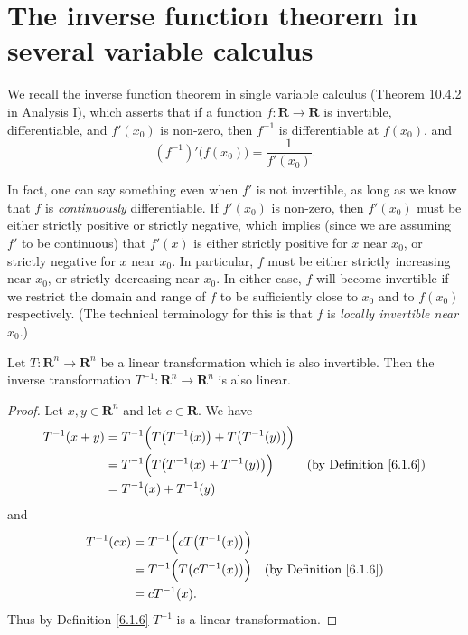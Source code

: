 \section{The inverse function theorem in several variable calculus}\label{sec 6.7}

\begin{note}
    We recall the inverse function theorem in single variable calculus (Theorem 10.4.2 in Analysis I), which asserts that if a function \(f : \mathbf{R} \to \mathbf{R}\) is invertible, differentiable, and \(f'(x_0)\) is non-zero, then \(f^{-1}\) is differentiable at \(f(x_0)\), and
    \[
        (f^{-1})'\big(f(x_0)\big) = \frac{1}{f'(x_0)}.
    \]

    In fact, one can say something even when \(f'\) is not invertible, as long as we know that \(f\) is \emph{continuously} differentiable.
    If \(f'(x_0)\) is non-zero, then \(f'(x_0)\) must be either strictly positive or strictly negative, which implies (since we are assuming \(f'\) to be continuous) that \(f'(x)\) is either strictly positive for \(x\) near \(x_0\), or strictly negative for \(x\) near \(x_0\).
    In particular, \(f\) must be either strictly increasing near \(x_0\), or strictly decreasing near \(x_0\).
    In either case, \(f\) will become invertible if we restrict the domain and range of \(f\) to be sufficiently close to \(x_0\) and to \(f(x_0)\) respectively.
    (The technical terminology for this is that \(f\) is \emph{locally invertible near \(x_0\)}.)
\end{note}

\begin{lemma}\label{6.7.1}
    Let \(T : \mathbf{R}^n \to \mathbf{R}^n\) be a linear transformation which is also invertible.
    Then the inverse transformation \(T^{-1} : \mathbf{R}^n \to \mathbf{R}^n\) is also linear.
\end{lemma}

\begin{proof}
    Let \(x, y \in \mathbf{R}^n\) and let \(c \in \mathbf{R}\).
    We have
    \begin{align*}
        T^{-1}(x + y) & = T^{-1}\Big(T\big(T^{-1}(x)\big) + T\big(T^{-1}(y)\big)\Big)                                      \\
                      & = T^{-1}\Big(T\big(T^{-1}(x) + T^{-1}(y)\big)\Big)            & \text{(by Definition \ref{6.1.6})} \\
                      & = T^{-1}(x) + T^{-1}(y)
    \end{align*}
    and
    \begin{align*}
        T^{-1}(cx) & = T^{-1}\Big(c T\big(T^{-1}(x)\big)\Big)                                      \\
                   & = T^{-1}\Big(T\big(c T^{-1}(x)\big)\Big) & \text{(by Definition \ref{6.1.6})} \\
                   & = c T^{-1}(x).
    \end{align*}
    Thus by Definition \ref{6.1.6} \(T^{-1}\) is a linear transformation.
\end{proof}

